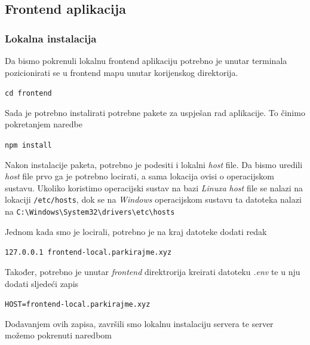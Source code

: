 		        
				\pagebreak
		

				\subsection{Frontend aplikacija}
	        
						\subsubsection*{Lokalna instalacija}
	        
	          		Da bismo pokrenuli lokalnu frontend aplikaciju potrebno je unutar terminala pozicionirati se u frontend mapu unutar korijenskog direktorija. 
	            
								\begin{center}
										\texttt{cd frontend}
								\end{center}
								
								Sada je potrebno instalirati potrebne pakete za uspješan rad aplikacije. To činimo pokretanjem naredbe
								
								\begin{center}
										\texttt{npm install}
								\end{center}
								
								Nakon instalacije paketa, potrebno je podesiti i lokalni \textit{host} file. Da bismo uredili \textit{host} file prvo ga je potrebno locirati, a sama lokacija ovisi o operacijskom sustavu. Ukoliko koristimo operacijski sustav na bazi \textit{Linuxa} \textit{host} file se nalazi na lokaciji \texttt{/etc/hosts}, dok se na \textit{Windows} operacijskom sustavu ta datoteka nalazi na \verb$C:\Windows\System32\drivers\etc\hosts$
								
								Jednom kada smo je locirali, potrebno je na kraj datoteke dodati redak

								\begin{center}
										\texttt{127.0.0.1	frontend-local.parkirajme.xyz}
								\end{center}

								Također, potrebno je unutar \textit{frontend} direktrorija kreirati datoteku \textit{.env} te u nju dodati sljedeći zapis

								\begin{center}
										\texttt{HOST=frontend-local.parkirajme.xyz}
								\end{center}
								
								Dodavanjem ovih zapisa, završili smo lokalnu instalaciju servera te server možemo pokrenuti naredbom
								
